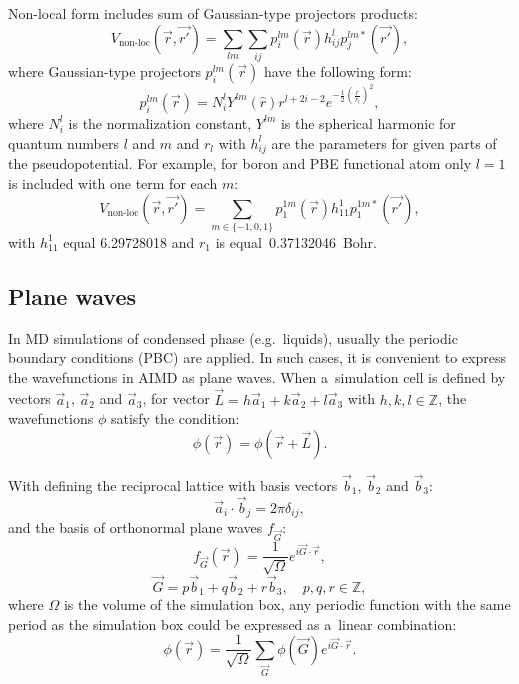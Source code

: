 Non-local form includes sum of Gaussian-type projectors products:
\begin{equation}
    V_{\text{non-loc}} (\vec{r}, \vec{r'}) = \sum_{lm} \sum_{ij} p_{i}^{lm}(\vec{r}) h_{ij}^{l} p_{j}^{lm*}(\vec{r'}),
\end{equation}
where Gaussian-type projectors $p_{i}^{lm}(\vec{r})$ have the following form:
\begin{equation}
    p_{i}^{lm}(\vec{r}) = N_i^{l} Y^{lm}(\hat{r}) r^{l + 2i - 2} e^{-\frac{1}{2} \left( \frac{r}{r_l}\right)^2},
\end{equation}
where $N_i^{l}$ is the normalization constant, $Y^{lm}$ is the spherical harmonic for quantum numbers $l$ and $m$ and $r_l$ with $h_{ij}^{l}$ are the parameters for given parts of the pseudopotential. For example, for boron and PBE functional atom only $l = 1$ is included with one term for each $m$:
\begin{equation}
    V_{\text{non-loc}} (\vec{r}, \vec{r'}) = \sum_{m \in \{-1, 0, 1\}} p_{1}^{1m}(\vec{r}) h_{11}^{1} p_{1}^{1m*}(\vec{r'}),
\end{equation}
with $h_{11}^{1}$ equal 6.29728018 and $r_1$ is equal~0.37132046~Bohr.

\subsection{Plane waves}

In MD simulations of condensed phase (e.g.~liquids), usually the periodic boundary conditions (PBC) are applied. In such cases, it is convenient to express the wavefunctions in AIMD as plane waves. When a~simulation cell is defined by vectors $\vec{a}_1$, $\vec{a}_2$ and $\vec{a}_3$, for vector $\vec{L} = h\vec{a}_1 + k\vec{a}_2 + l \vec{a}_3$ with $h, k, l \in \mathbb{Z}$, the wavefunctions $\phi$ satisfy the condition:
\begin{equation}
    \phi (\vec{r}) = \phi (\vec{r} + \vec{L}).
\end{equation}

With defining the reciprocal lattice with basis vectors $\vec{b}_1$, $\vec{b}_2$ and $\vec{b}_3$:
\begin{equation}
    \vec{a}_i \cdot \vec{b}_j = 2\pi \delta_{ij},
\end{equation}
and the basis of orthonormal plane waves $f_{\vec{G}}$:
\begin{equation}
    f_{\vec{G}} (\vec{r}) = \frac{1}{\sqrt{\Omega}} e^{i \vec{G} \cdot \vec{r}},
\end{equation}
\begin{equation}
    \vec{G} = p\vec{b}_1 + q\vec{b}_2 + r\vec{b}_3, \quad p, q, r \in \mathbb{Z},
\end{equation}
where $\Omega$ is the volume of the simulation box, any periodic function with the same period as the simulation box could be expressed as a~linear combination:
\begin{equation}
    \phi (\vec{r}) = \frac{1}{\sqrt{\Omega}} \sum_{\vec{G}} \phi(\vec{G}) e^{i \vec{G} \cdot \vec{r}}.
    \label{eq:plane-waves-combination}
\end{equation}

